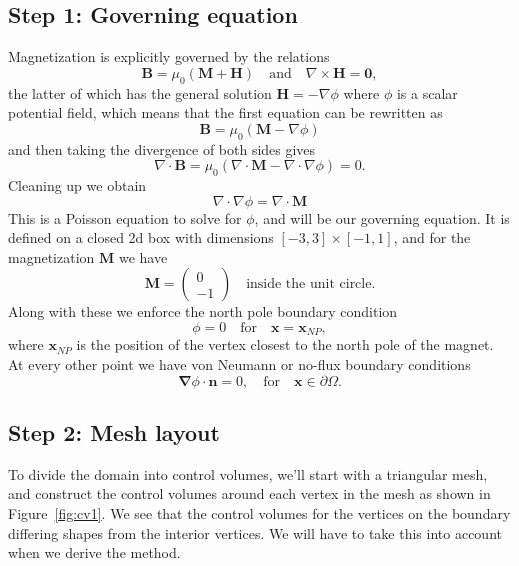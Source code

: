 \documentclass[acmtog]{acmart}
\begin{document}
\subsection*{Step 1: Governing equation}
Magnetization is explicitly governed by the relations
%
\begin{equation}
  \boldsymbol B = \mu_0 \left(\boldsymbol M + \boldsymbol H\right) \quad \text{and} \quad \nabla \times \boldsymbol H = \boldsymbol 0,
\end{equation}
%
the latter of which has the general solution $\boldsymbol H = - \nabla \phi$ where $\phi$ is a scalar potential field, which means that the first equation can be rewritten as
%
\begin{equation}
  \boldsymbol B = \mu_0 \left(\boldsymbol M - \nabla \phi \right)
\end{equation}
%
and then taking the divergence of both sides gives
%
\begin{equation}
  \nabla \cdot \boldsymbol B = \mu_0 \left( \nabla \cdot \boldsymbol M - \nabla \cdot \nabla \phi \right) = 0.
\end{equation}
%
Cleaning up we obtain
%
\begin{equation}
  \nabla \cdot \nabla \phi = \nabla \cdot \boldsymbol M
\end{equation}
%
This is a Poisson equation to solve for $\phi$, and will be our governing equation. It is defined on a closed 2d box with dimensions $[-3, 3] \times [-1, 1]$, and for the magnetization $\boldsymbol M$ we have
%
\begin{equation}
  \boldsymbol M = \begin{pmatrix}
    0 \\ -1
  \end{pmatrix} \quad \text{inside the unit circle}.
\end{equation}
%
Along with these we enforce the north pole boundary condition
%
\begin{equation}
  \phi = 0 \quad \text{for} \quad \boldsymbol x = \boldsymbol x_{NP},
\end{equation}
%
where $\boldsymbol x_{NP}$ is the position of the vertex closest to the north pole of the magnet. At every other point we have von Neumann or no-flux boundary conditions
%
\begin{equation}
  \boldsymbol \nabla \phi \cdot \boldsymbol n = 0, \quad \text{for} \quad \boldsymbol x \in \partial \Omega.
\end{equation}
%


\subsection*{Step 2: Mesh layout}
To divide the domain into control volumes, we'll start with a triangular mesh, and construct the control volumes around each vertex in the mesh as shown in Figure\ \ref{fig:cv1}. We see that the control volumes for the vertices on the boundary differing shapes from the interior vertices. We will have to take this into account when we derive the method.
\end{document}
